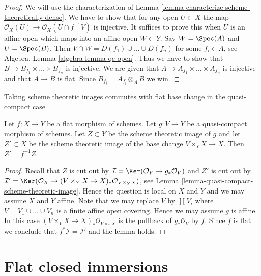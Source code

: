 \begin{proof}
We will use the characterization of
Lemma \ref{lemma-characterize-scheme-theoretically-dense}.
We have to show that for any open $U \subset X$ the map
$\mathcal{O}_X(U) \to \mathcal{O}_X(U \cap f^{-1}V)$ is injective.
It suffices to prove this when $U$ is an affine open which maps into
an affine open $W \subset Y$. Say $W = \Spec(A)$ and $U = \Spec(B)$.
Then $V \cap W = D(f_1) \cup \ldots \cup D(f_n)$ for some
$f_i \in A$, see
Algebra, Lemma \ref{algebra-lemma-qc-open}.
Thus we have to show that
$B \to B_{f_1} \times \ldots \times B_{f_n}$ is injective.
We are given that $A \to A_{f_1} \times \ldots \times A_{f_n}$ is injective
and that $A \to B$ is flat. Since $B_{f_i} = A_{f_i} \otimes_A B$ we win.
\end{proof}

\begin{lemma}
\label{lemma-flat-base-change-scheme-theoretic-image}
\begin{slogan}
Taking scheme theoretic images commutes with flat base change
in the quasi-compact case
\end{slogan}
Let $f : X \to Y$ be a flat morphism of schemes. Let $g : V \to Y$ be a
quasi-compact morphism of schemes. Let $Z \subset Y$ be the scheme theoretic
image of $g$ and let $Z' \subset X$ be the scheme theoretic image of the
base change $V \times_Y X \to X$. Then $Z' = f^{-1}Z$.
\end{lemma}

\begin{proof}
Recall that $Z$ is cut out by
$\mathcal{I} = \Ker(\mathcal{O}_Y \to g_*\mathcal{O}_V)$
and $Z'$ is cut out by
$\mathcal{I}' = \Ker(\mathcal{O}_X \to
(V \times_Y X \to X)_*\mathcal{O}_{V \times_Y X})$, see
Lemma \ref{lemma-quasi-compact-scheme-theoretic-image}.
Hence the question is local on $X$ and $Y$ and we may assume $X$ and $Y$
affine. Note that we may replace $V$ by $\coprod V_i$ where
$V = V_1 \cup \ldots \cup V_n$ is a finite affine open covering.
Hence we may assume $g$ is affine. In this case
$(V \times_Y X \to X)_*\mathcal{O}_{V \times_Y X}$ is the pullback
of $g_*\mathcal{O}_V$ by $f$. Since $f$ is flat we conclude that
$f^*\mathcal{I} = \mathcal{I}'$ and the lemma holds.
\end{proof}




\section{Flat closed immersions}
\label{section-flat-closed-immersions}

